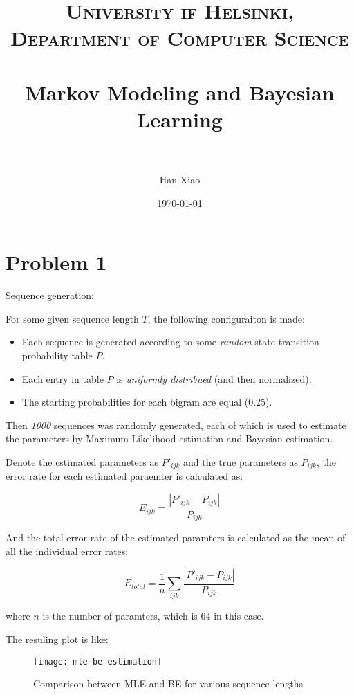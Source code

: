 \documentclass[paper=a4, fontsize=11pt]{scrartcl} %
\title{	
\normalfont \normalsize 
\textsc{University if Helsinki, Department of Computer Science} \\ [25pt] %
\horrule{0.5pt} \\[0.4cm] %
\huge Markov Modeling and Bayesian Learning \\ %
\horrule{2pt} \\[0.5cm] %
}
\author{Han Xiao} %
\date{\normalsize\today} %
\numberwithin{equation}{section} %
\numberwithin{figure}{section} %
\numberwithin{table}{section} %
\begin{document}
\maketitle %


\section{Problem 1}

\lipsum[2] %

Sequence generation:

For some given sequence length $T$, the following configuraiton is made:

\begin {itemize}
  \item Each sequence is generated according to some {\em random} state transition probability table $P$.
  \item Each entry in table $P$ is {\em uniformly distribued} (and then normalized).
  \item The starting probabilities for each bigram are equal (0.25).
\end {itemize}


Then {\em 1000} sequences was randomly generated, each of which is used to estimate the parameters by Maximum Likelihood estimation and Bayesian estimation.

Denote the estimated parameters as $P'_{ijk}$ and the true parameters as $P_{ijk}$, the error rate for each estimated paraemter is calculated as:

\[ E_{ijk} = \frac{|P'_{ijk} - P_{ijk}|} {P_{ijk}} \]

And the total error rate of the estimated paramters is calculated as the mean of all the individual error rates:

\[E_{total} = \frac {1} {n} \sum\limits_{ijk} \frac{|P'_{ijk} - P_{ijk}| }{ P_{ijk}}\]

where $n$ is the number of paramters, which is $64$ in this case.

The resuling plot is like: 

\begin{figure}[H]
  \centering
  \texttt{[image: mle-be-estimation]}
  \caption{Comparison between MLE and BE for various sequence lengths}
\end{figure}
\end{document}
